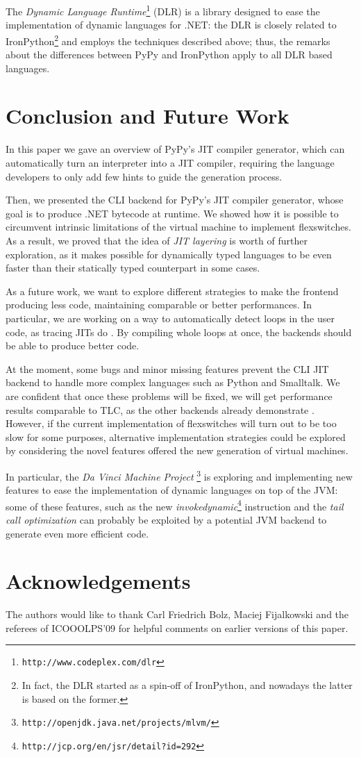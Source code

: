 The \emph{Dynamic Language Runtime}\footnote{\texttt{http://www.codeplex.com/dlr}}
(DLR) is a library designed to ease the implementation of dynamic languages
for .NET: the DLR is closely related to IronPython\footnote{In fact, the DLR
  started as a spin-off of IronPython, and nowadays the latter is based on the
  former.} and employs the techniques described above; thus, the remarks
about the differences between PyPy and IronPython apply to all DLR based
languages.

\section{Conclusion and Future Work}

In this paper we gave an overview of PyPy's JIT compiler generator,
which can automatically turn an interpreter into a JIT
compiler, requiring the language developers to only add few hints to
guide the generation process.

Then, we presented the CLI backend for PyPy's JIT compiler generator, whose
goal is to produce .NET bytecode at runtime.  We showed how it is possible to
circumvent intrinsic limitations of the virtual machine to implement
flexswitches.  As a result, we proved that the idea of \emph{JIT layering} is
worth of further exploration, as it makes possible for dynamically typed
languages to be even faster than their statically typed counterpart in some
cases.

As a future work, we want to explore different strategies to make the frontend
producing less code, maintaining comparable or better performances.  In
particular, we are working on a way to automatically detect loops in the user
code, as tracing JITs do \cite{gal_hotpathvm_2006}.  By compiling whole
loops at once, the backends should be able to produce better code.

At the moment, some bugs and minor missing features prevent the CLI JIT
backend to handle more complex languages such as Python and Smalltalk.  We are
confident that once these problems will be fixed, we will get performance
results comparable to TLC, as the other backends already demonstrate
\cite{PyPyJIT}.  However, if the current implementation of flexswitches will
turn out to be too slow for some purposes, alternative
implementation strategies could be explored by considering the novel features 
offered the new generation of virtual machines.

In particular, the \emph{Da Vinci Machine
  Project} \footnote{\texttt{http://openjdk.java.net/projects/mlvm/}} is exploring and
implementing new features to ease the implementation of dynamic languages on
top of the JVM: some of these features, such as the new
\emph{invokedynamic}\footnote{\texttt{http://jcp.org/en/jsr/detail?id=292}} instruction and the \emph{tail call
  optimization} can probably be exploited by a potential JVM backend to
generate even more efficient code.



\section*{Acknowledgements}

The authors would like to thank Carl Friedrich Bolz, Maciej Fijalkowski and
the referees of ICOOOLPS'09 for helpful comments on earlier versions of this
paper.

